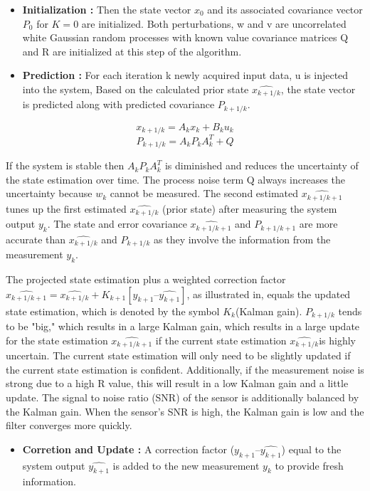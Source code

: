 \begin{itemize}
    \item \textbf{Initialization :} Then the state vector $x_0$ and its associated covariance vector $P_0$ for $K=0$ are initialized. Both perturbations, w and v are uncorrelated white Gaussian random processes with known value covariance matrices Q and R are initialized at this step of the algorithm.
    \item \textbf{Prediction :} For each iteration k newly acquired input data, u is injected into the system, Based on the calculated prior state $\hat{x_{k+1/k}}$, the state vector is predicted along with predicted covariance $P_{k+1/k}$.
\end{itemize}

\begin{equation}\label{eq:Discrete_Prior_State_Equation}
    x_{k+1/k} = A_k x_k + B_k u_k 
\end{equation}
\begin{equation}\label{eq:Discrete_Prior_Covariance_Equation}
    P_{k+1/k} = A_k P_k A_k^{T} + Q
\end{equation}

If the system is stable then $A_k P_k A_k^{T}$ is diminished and reduces the uncertainty of the state estimation over time. The process noise term Q always increases the
uncertainty because $w_k$ cannot be measured. The second estimated $\hat{x_{k + 1/k + 1}}$ tunes up the first estimated $\hat{x_{k + 1/k}}$ (prior state) after measuring the system output $y_k$. The state and error covariance $\hat{x_{k + 1/k + 1}}$ and $P_{k + 1/k + 1}$
are more accurate than $\hat{x_{k + 1/k}}$ and $P_{k+1/k}$ as they involve the information from the measurement $y_k$.

The projected state estimation plus a weighted correction factor  $\hat{x_{k + 1/k + 1}} = \hat{x_{k + 1/k}} + K_{k + 1} [y_{k + 1} –  \hat{y_{k + 1}}]$, as illustrated in, equals the updated state estimation, which is denoted by the symbol $K_k$(Kalman gain).
$P_{k+1/k}$ tends to be "big," which results in a large Kalman gain, which results in a large update for the state estimation $\hat{x_{k + 1/k + 1}}$ if the current state estimation $\hat{x_{k + 1/k}}$is highly uncertain.
The current state estimation will only need to be slightly updated if the current state estimation is confident. Additionally, if the measurement noise is strong due to a high R value, this will result in a low Kalman gain and a little update. The signal to noise ratio (SNR) of the sensor is additionally balanced by the Kalman gain. When the sensor's SNR is high, the Kalman gain is low and the filter converges more quickly.
\begin{itemize}
    \item \textbf{Corretion and Update :} A correction factor ($y_{k + 1} –  \hat{y_{k + 1}}$) equal to the system output $ \hat{y_{k + 1}}$ is added to the new measurement $y_k$ to provide fresh information.
\end{itemize}

